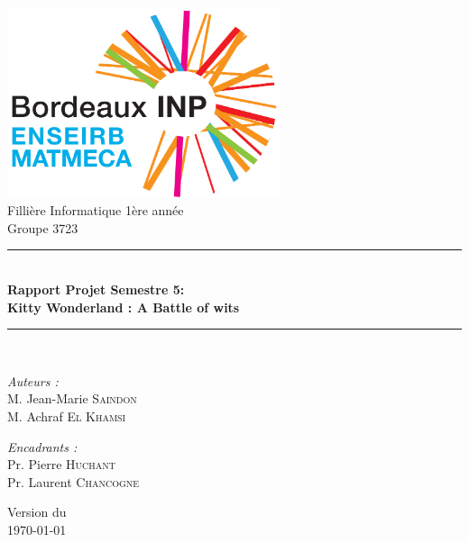 \documentclass[a4paper]{article}
\begin{document}
\begin{titlepage}
\begin{center}

\includegraphics[width=0.6\textwidth]{logo_enseirb}\\[1cm]

{\large Fillière Informatique 1ère année}\\[0.5cm]

{\large Groupe 3723}\\[0.5cm]

\rule{\linewidth}{0.5mm} \\[0.4cm]
{ \huge \bfseries Rapport Projet Semestre 5: \\[0.4cm]
				Kitty Wonderland : A Battle of wits \\[0.4cm]}
\rule{\linewidth}{0.5mm} \\[1.5cm]

\noindent
\begin{minipage}{0.4\textwidth}
  \begin{flushleft} \large
    \emph{Auteurs :}\\
    M. Jean-Marie \textsc{Saindon}\\
    M. Achraf \textsc{El Khamsi}
  \end{flushleft}
\end{minipage}
\begin{minipage}{0.4\textwidth}
  \begin{flushright} \large
    \emph{Encadrants :} \\
    Pr. Pierre \textsc{Huchant}\\
    Pr. Laurent \textsc{Chancogne}
  \end{flushright}
\end{minipage}

\vfill

{\large Version du\\ \today}

\end{center}
\end{titlepage}
\newpage
\tableofcontents
\newpage
\end{document}
